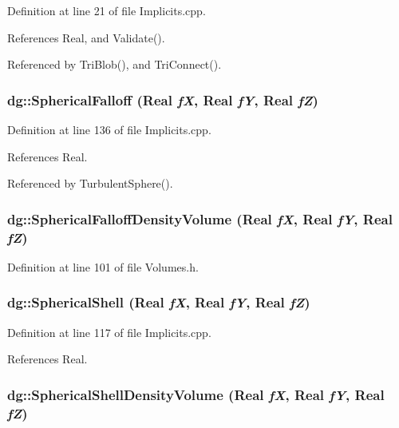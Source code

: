 Definition at line 21 of file Implicits.cpp.

References Real, and Validate().

Referenced by Tri\-Blob(), and Tri\-Connect().
\subsubsection{ dg::Spherical\-Falloff ({\bf Real} {\em f\-X}, {\bf Real} {\em f\-Y}, {\bf Real} {\em f\-Z})}\label{namespacedg_a81}




Definition at line 136 of file Implicits.cpp.

References Real.

Referenced by Turbulent\-Sphere().
\subsubsection{ dg::Spherical\-Falloff\-Density\-Volume ({\bf Real} {\em f\-X}, {\bf Real} {\em f\-Y}, {\bf Real} {\em f\-Z})\hspace{0.3cm}{\tt  [inline]}}\label{namespacedg_a195}




Definition at line 101 of file Volumes.h.
\subsubsection{ dg::Spherical\-Shell ({\bf Real} {\em f\-X}, {\bf Real} {\em f\-Y}, {\bf Real} {\em f\-Z})}\label{namespacedg_a80}




Definition at line 117 of file Implicits.cpp.

References Real.
\subsubsection{ dg::Spherical\-Shell\-Density\-Volume ({\bf Real} {\em f\-X}, {\bf Real} {\em f\-Y}, {\bf Real} {\em f\-Z})\hspace{0.3cm}{\tt  [inline]}}\label{namespacedg_a194}




